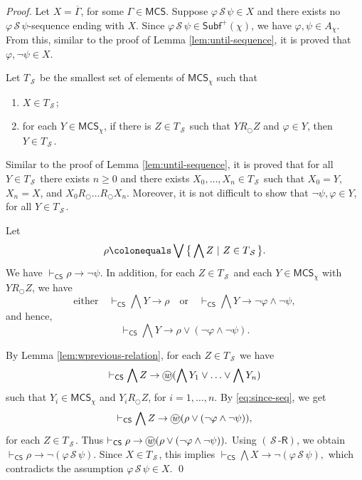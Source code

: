 \documentclass[envcountsect,envcountsame,oribibl,orivec]{llncs}
\newcommand*\circled[1]{\tikz[baseline=(char.base)]{
		\node[shape=circle,draw,inner sep=0.4pt] (char) {#1};}}
\newcommand{\lnext}{\bigcirc}
\newcommand{\lsince}{{\,\mathcal{S}\,}}
\newcommand{\wprevious}{\circled{\textit{w}}}
\newcommand{\sindrule}{\ensuremath{(\lsince\textsf{-R})}}
\newcommand{\CS}{\textsf{CS}}
\renewcommand{\phi}{\varphi}
\newcommand{\Subf}{\mathsf{Subf}}
\newcommand{\MCS}{\mathsf{MCS}}
\begin{document}
\begin{proof}
	Let $X = \overline{\Gamma}$, for some $\Gamma \in \MCS$. Suppose $\phi \lsince \psi \in X$ and there exists no  $\phi \lsince \psi$-sequence ending with $X$. Since $\phi \lsince \psi \in  \Subf^+(\chi)$, we have  $\phi,\psi \in  A_\chi$. From this, similar to the proof of Lemma \ref{lem:until-sequence}, it is proved that $\phi, \neg \psi \in X$.
	
	Let $T_\lsince$ be the smallest set of elements of $\MCS_\chi$ such that
	\begin{enumerate}
		\item $X \in T_\lsince$;
		\item for each $Y \in \MCS_\chi$, if there is $Z \in T_\lsince$ such that $Y R_\lnext Z$ and $\phi \in Y$, then $Y \in T_\lsince$.
		
	\end{enumerate}
	
	Similar to the proof of Lemma \ref{lem:until-sequence}, it is proved that
	for all $Y \in T_\lsince$ there exists $n \geq 0$ and there exists $X_0, \ldots,X_n \in T_\lsince$ such that $X_0 = Y$, $X_n = X$,  and $X_0 R_\lnext \ldots R_\lnext X_n.$ 	Moreover, it is not difficult to show that $\neg \psi, \phi \in Y$, for all $Y \in T_\lsince$.
	
	
	Let 
	\[
	\rho \colonequals \bigvee \big\{ \bigwedge Z \ |\ Z \in T_\lsince \big\}.
	\]
	We have $\vdash_\CS \rho \to \lnot \psi$. In addition, for each $Z \in T_\lsince$ and each $Y \in \MCS_\chi$ with $Y R_\lnext Z$, we have 
	\[
	\text{either}\quad
	\vdash_\CS \bigwedge Y \to \rho \quad \text{or} \quad \vdash_\CS \bigwedge Y \to \lnot \phi \land \lnot \psi,
	\]
	and hence, 
	\begin{equation}\label{eq:since-seq}
		\vdash_\CS \bigwedge Y \to \rho \vee (\lnot \phi \land \lnot \psi).
	\end{equation}
	
	By Lemma \ref{lem:wprevious-relation}, for each $Z \in T_\lsince$ we have 
	\[
	\vdash_\CS \bigwedge Z \to \wprevious (\bigwedge Y_1 \vee \ldots \vee \bigwedge Y_n)
	\]
	such that $Y_i \in \MCS_\chi$ and $Y_i R_\lnext Z$, for $i=1,\ldots,n$. By \eqref{eq:since-seq}, we get 
	\[
	\vdash_\CS \bigwedge Z \to \wprevious (\rho \vee (\neg \phi \wedge \neg \psi)),
	\]
	for each $Z \in T_\lsince$. Thus
	$
	\vdash_\CS \rho \to \wprevious (\rho \lor (\lnot \phi \land \lnot \psi)).
	$
	Using $\sindrule$, we obtain $\vdash_\CS \rho \to \lnot(\phi \lsince \psi)$.
	Since $X \in T_\lsince$, this implies  
	$
	\vdash_\CS \bigwedge X \to \lnot(\phi \lsince \psi),
	$
	which contradicts the assumption
	$\phi \lsince \psi \in X$.  \qed
\end{proof}
\end{document}
